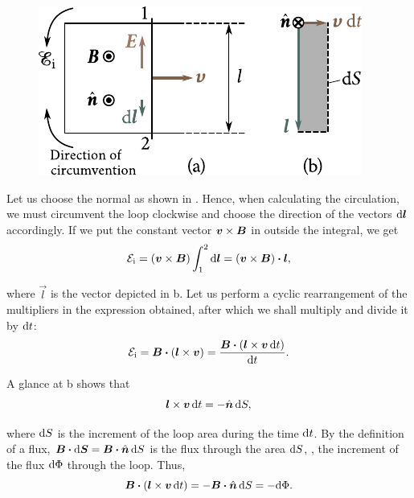 \begin{figure}[t]
	\begin{center}
		\includegraphics[scale=1]{figures/ch_08/fig_8_2.pdf}
		\caption[]{}
		\label{fig:8_2}
	\end{center}
	\vspace{-0.8cm}
\end{figure}

Let us choose the normal as shown in .
Hence, when calculating the circulation, we must circumvent the loop clockwise and choose the direction of the vectors $\mathrm{d}\boldsymbol{l}$ accordingly.
If we put the constant vector $\boldsymbol{v}\times\boldsymbol{B}$ in  outside the integral, we get
\begin{equation*}
    \mathcal{E}_{\text{i}} = (\boldsymbol{v}\times\boldsymbol{B}) \int_1^2 \mathrm{d}\boldsymbol{l} = (\boldsymbol{v}\times\boldsymbol{B}) \boldsymbol{\cdot} \boldsymbol{l},
\end{equation*}

\noindent
where $\vec{l}$ is the vector depicted in b.
Let us perform a cyclic rearrangement of the multipliers in the expression obtained, after which we shall multiply and divide it by $\mathrm{d} t$:
\begin{equation}\label{eq:8_3}
    \mathcal{E}_{\text{i}} = \boldsymbol{B} \boldsymbol{\cdot} (\boldsymbol{l}\times\boldsymbol{v}) = \frac{\boldsymbol{B} \boldsymbol{\cdot} (\boldsymbol{l} \times \boldsymbol{v}\, \mathrm{d} t)}{\mathrm{d} t}.
\end{equation}

\noindent
A glance at b shows that
\begin{equation*}
    \boldsymbol{l} \times \boldsymbol{v}\, \mathrm{d} t = - \hat{\boldsymbol{n}}\, \mathrm{d} S,
\end{equation*}

\noindent
where $\mathrm{d} S$ is the increment of the loop area during the time $\mathrm{d} t$.
By the definition of a flux, $\boldsymbol{B}\boldsymbol{\cdot}{\mathrm{d}\boldsymbol{S}}=\boldsymbol{B}\boldsymbol{\cdot}\hat{\boldsymbol{n}}\,\mathrm{d} S$ is the flux through the area $\mathrm{d} S$, \ie, the increment of the flux $\mathrm{d}\Phi$ through the loop.
Thus,
\begin{equation*}
    \boldsymbol{B} \boldsymbol{\cdot} (\boldsymbol{l} \times \boldsymbol{v}\, \mathrm{d} t) = - \boldsymbol{B} \boldsymbol{\cdot} \hat{\boldsymbol{n}}\, \mathrm{d} S = - \mathrm{d}\Phi.
\end{equation*}

